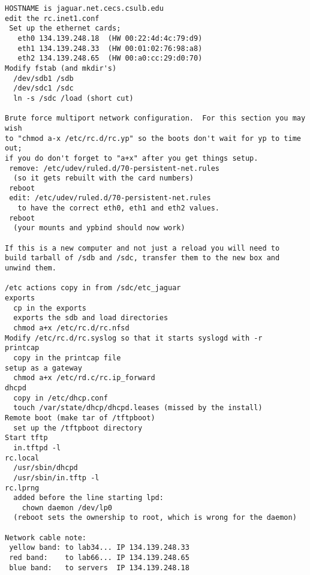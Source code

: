 \begin{verbatim}
HOSTNAME is jaguar.net.cecs.csulb.edu
edit the rc.inet1.conf
 Set up the ethernet cards;
   eth0 134.139.248.18  (HW 00:22:4d:4c:79:d9)
   eth1 134.139.248.33  (HW 00:01:02:76:98:a8)
   eth2 134.139.248.65  (HW 00:a0:cc:29:d0:70)
Modify fstab (and mkdir's)
  /dev/sdb1 /sdb
  /dev/sdc1 /sdc
  ln -s /sdc /load (short cut)

Brute force multiport network configuration.  For this section you may wish
to "chmod a-x /etc/rc.d/rc.yp" so the boots don't wait for yp to time out;
if you do don't forget to "a+x" after you get things setup.
 remove: /etc/udev/ruled.d/70-persistent-net.rules
  (so it gets rebuilt with the card numbers)
 reboot
 edit: /etc/udev/ruled.d/70-persistent-net.rules
   to have the correct eth0, eth1 and eth2 values.
 reboot
  (your mounts and ypbind should now work)

If this is a new computer and not just a reload you will need to
build tarball of /sdb and /sdc, transfer them to the new box and
unwind them.

/etc actions copy in from /sdc/etc_jaguar
exports
  cp in the exports 
  exports the sdb and load directories
  chmod a+x /etc/rc.d/rc.nfsd
Modify /etc/rc.d/rc.syslog so that it starts syslogd with -r
printcap
  copy in the printcap file
setup as a gateway
  chmod a+x /etc/rd.c/rc.ip_forward
dhcpd
  copy in /etc/dhcp.conf
  touch /var/state/dhcp/dhcpd.leases (missed by the install)
Remote boot (make tar of /tftpboot)
  set up the /tftpboot directory
Start tftp
  in.tftpd -l
rc.local
  /usr/sbin/dhcpd
  /usr/sbin/in.tftp -l
rc.lprng
  added before the line starting lpd:
    chown daemon /dev/lp0
  (reboot sets the ownership to root, which is wrong for the daemon)

Network cable note:
 yellow band: to lab34... IP 134.139.248.33
 red band:    to lab66... IP 134.139.248.65
 blue band:   to servers  IP 134.139.248.18

\end{verbatim}
